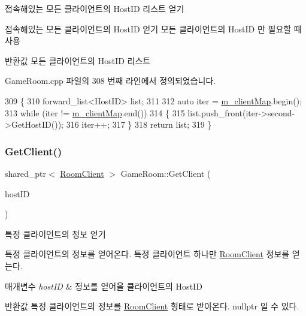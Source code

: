 접속해있는 모든 클라이언트의 Host\+ID 리스트 얻기 

접속해있는 모든 클라이언트의 Host\+ID 얻기  모든 클라이언트의 Host\+ID 만 필요할 때 사용

\begin{DoxyReturn}{반환값}
모든 클라이언트의 Host\+ID 리스트 
\end{DoxyReturn}


Game\+Room.\+cpp 파일의 308 번째 라인에서 정의되었습니다.


\begin{DoxyCode}
309 \{
310     forward\_list<HostID> list;
311 
312     \textcolor{keyword}{auto} iter = \hyperlink{class_game_room_afc202a511605453216f7dd870ff96c5c}{m\_clientMap}.begin();
313     \textcolor{keywordflow}{while} (iter != \hyperlink{class_game_room_afc202a511605453216f7dd870ff96c5c}{m\_clientMap}.end())
314     \{
315         list.push\_front(iter->second->GetHostID());
316         iter++;
317     \}
318     \textcolor{keywordflow}{return} list;
319 \}
\end{DoxyCode}
\mbox{\label{class_game_room_af9eed2640f6fe818e1528d997895f8d6}} 
\subsubsection{\texorpdfstring{Get\+Client()}{GetClient()}}
{\footnotesize\ttfamily shared\+\_\+ptr$<$ \hyperlink{class_room_client}{Room\+Client} $>$ Game\+Room\+::\+Get\+Client (\begin{DoxyParamCaption}\item[{Host\+ID}]{host\+ID }\end{DoxyParamCaption})}



특정 클라이언트의 정보 얻기 

특정 클라이언트의 정보를 얻어온다.  특정 클라이언트 하나만 \hyperlink{class_room_client}{Room\+Client} 정보를 얻는다.


\begin{DoxyParams}{매개변수}
{\em host\+ID} & 정보를 얻어올 클라이언트의 Host\+ID \\
\hline
\end{DoxyParams}
\begin{DoxyReturn}{반환값}
특정 클라이언트의 정보를 \hyperlink{class_room_client}{Room\+Client} 형태로 받아온다. nullptr 일 수 있다. 
\end{DoxyReturn}


